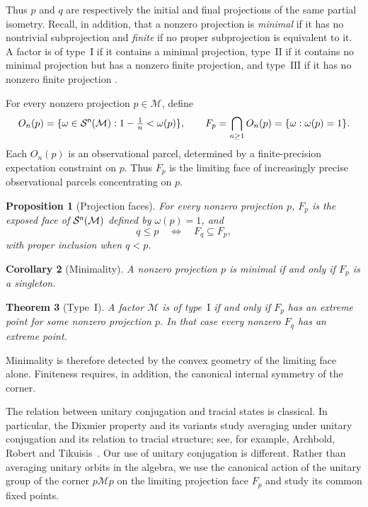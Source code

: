 \documentclass[11pt]{article}
\newtheorem{theorem}{Theorem}[section]
\newtheorem{corollary}[theorem]{Corollary}
\newtheorem{proposition}[theorem]{Proposition}
\begin{document}
Thus $p$ and $q$ are respectively the initial and final projections of
the same partial isometry. Recall, in addition, that a nonzero projection is \emph{minimal}
if it has no nontrivial subprojection and \emph{finite} if no proper
subprojection is equivalent to it. A factor is of type~$\mathrm I$ if it
contains a minimal projection, type~$\mathrm{II}$ if it contains no
minimal projection but has a nonzero finite projection, and
type~$\mathrm{III}$ if it has no nonzero finite projection
\cite[Ch.~6]{KadisonRingrose2}.

For every nonzero projection $p\in\mathcal M$, define
\[
O_n(p)
=
\{\omega\in\mathcal S^{\sf n}(\mathcal M):
1-\tfrac1n<\omega(p)\},
\qquad
F_p
=
\bigcap_{n\geq1}O_n(p)
=
\{\omega:\omega(p)=1\}.
\]
Each $O_n(p)$ is an observational parcel, determined by a
finite-precision expectation constraint on $p$. Thus $F_p$ is the
limiting face of increasingly precise observational parcels
concentrating on $p$.

\begin{proposition}[Projection faces]
\label{prop:face}
For every nonzero projection $p$, $F_p$ is the exposed face of
$\mathcal S^{\sf n}(\mathcal M)$ defined by $\omega(p)=1$, and
\[
q\leq p
\quad\Longleftrightarrow\quad
F_q\subseteq F_p,
\]
with proper inclusion when $q<p$.
\end{proposition}

\begin{corollary}[Minimality]
\label{cor:minimal}
A nonzero projection $p$ is minimal if and only if $F_p$ is a singleton.
\end{corollary}

\begin{theorem}[Type~$\mathrm I$]
\label{thm:typeI}
A factor $\mathcal M$ is of type~$\mathrm I$ if and only if $F_p$ has an
extreme point for some nonzero projection $p$. In that case every nonzero
$F_q$ has an extreme point.
\end{theorem}

Minimality is therefore detected by the convex geometry of the limiting
face alone. Finiteness requires, in addition, the canonical internal
symmetry of the corner.

The relation between unitary conjugation and tracial states is classical.
In particular, the Dixmier property and its variants study averaging
under unitary conjugation and its relation to tracial structure; see, for
example, Archbold, Robert and Tikuisis~\cite{ArchboldRobertTikuisis2017}.
Our use of unitary conjugation is different. Rather than averaging unitary
orbits in the algebra, we use the canonical action of the unitary group of
the corner $p\mathcal Mp$ on the limiting projection face $F_p$ and study
its common fixed points.
\end{document}
